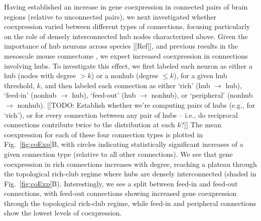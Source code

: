 \documentclass[10pt,letterpaper]{article}
\begin{document}
Having established an increase in gene coexpression in connected pairs of brain regions (relative to unconnected pairs), we next investigated whether coexpression varied between different types of connections, focusing particularly on the role of densely interconnected hub nodes characterized above.
Given the importance of hub neurons across species [[Ref]], and previous results in the mesoscale mouse connectome \cite{Fulcher:2016ck}, we expect increased coexpression in connections involving hubs.
To investigate this effect, we first labeled each neuron as either a hub (nodes with degree $> k$) or a nonhub (degree $\leq k$), for a given hub threshold, $k$, and then labeled each connection as either `rich' (hub $\rightarrow$ hub), `feed-in' (nonhub $\rightarrow$ hub), `feed-out' (hub $\rightarrow$ nonhub), or `peripheral' (nonhub $\rightarrow$ nonhub).
[[TODO: Establish whether we're computing pairs of hubs (e.g., for `rich'), or for every connection between any pair of hubs -- i.e., do reciprocal connections contribute twice to the distribution at each $k$?]]
The mean coexpression for each of these four connection types is plotted in Fig.~\ref{fig:coExp}B, with circles indicating statistically significant increases of a given connection type (relative to all other connections). 
We see that gene coexpression in rich connections increases with degree, reaching a plateau through the topological rich-club regime where hubs are densely interconnected (shaded in Fig.~\ref{fig:coExp}B).
Interestingly, we see a split between feed-in and feed-out connections, with feed-out connections showing increased gene coexpression through the topological rich-club regime, while feed-in and peripheral connections show the lowest levels of coexpression.
\end{document}
